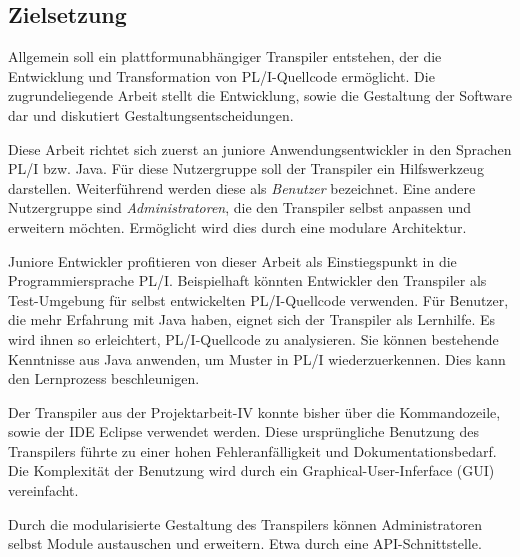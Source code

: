\subsection{Zielsetzung}
Allgemein soll ein plattformunabhängiger Transpiler entstehen, der die Entwicklung und Transformation von PL/I-Quellcode ermöglicht. Die zugrundeliegende Arbeit stellt die Entwicklung, sowie die Gestaltung der Software dar und diskutiert Gestaltungsentscheidungen. 

Diese Arbeit richtet sich zuerst an juniore Anwendungsentwickler in den Sprachen PL/I bzw. Java. Für diese Nutzergruppe soll der Transpiler ein Hilfswerkzeug darstellen. Weiterführend werden diese als \emph{Benutzer} bezeichnet. Eine andere Nutzergruppe sind \emph{Administratoren}, die den Transpiler selbst anpassen und erweitern möchten. Ermöglicht wird dies durch eine modulare Architektur.

Juniore Entwickler profitieren von dieser Arbeit als Einstiegspunkt in die Programmiersprache PL/I. Beispielhaft könnten Entwickler den Transpiler als Test-Umgebung für selbst entwickelten PL/I-Quellcode verwenden. Für Benutzer, die mehr Erfahrung mit Java haben, eignet sich der Transpiler als Lernhilfe. Es wird ihnen so erleichtert, PL/I-Quellcode zu analysieren. Sie können bestehende Kenntnisse aus Java anwenden, um Muster in PL/I wiederzuerkennen. Dies kann den Lernprozess beschleunigen.

Der Transpiler aus der Projektarbeit-IV konnte bisher über die Kommandozeile, sowie der IDE Eclipse verwendet werden. Diese ursprüngliche Benutzung des Transpilers führte zu einer hohen Fehleranfälligkeit und Dokumentationsbedarf. Die Komplexität der Benutzung wird durch ein Graphical-User-Inferface (GUI) vereinfacht.

Durch die modularisierte Gestaltung des Transpilers können Administratoren selbst Module austauschen und erweitern. 
Etwa durch eine API-Schnittstelle. 

